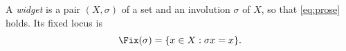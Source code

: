 \begin{definition}[Widget]\label{sy-0001}
A \emph{widget} is a pair $(X,\sigma)$ of a set and an involution $\sigma$ of $X$, so that \eqref{eq:prose} holds. Its fixed locus is
\begin{equation}\label{eq:fix}
\Fix(\sigma) = \{x \in X : \sigma x = x\}.
\end{equation}
\end{definition}
